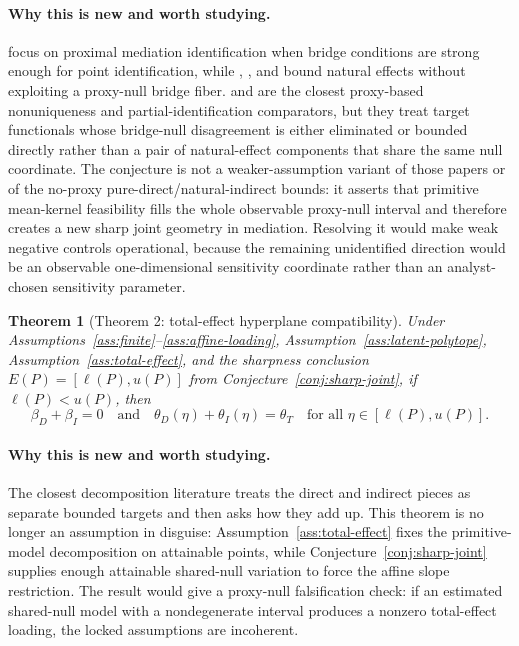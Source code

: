 \documentclass[11pt]{article}
\theoremstyle{definition}
\theoremstyle{plain}
\newtheorem{theorem}{Theorem}
\theoremstyle{remark}
\begin{document}
\paragraph{Why this is new and worth studying.}
\citet{DukesShpitserTchetgen2023} focus on proximal mediation identification
when bridge conditions are strong enough for point identification, while
\citet{MilesKankiMeloniTchetgen2015},
\citet{MilesKankiMeloniTchetgen2017}, and
\citet{DingVanderWeele2016} bound natural effects without exploiting a
proxy-null bridge fiber.
\citet{ZhangLiMiaoTchetgen2023} and
\citet{GhassamiShpitserTchetgen2023} are the closest proxy-based
nonuniqueness and partial-identification comparators, but they treat target
functionals whose bridge-null disagreement is either eliminated or bounded
directly rather than a pair of natural-effect components that share the same
null coordinate.  The conjecture is not a weaker-assumption variant of those
papers or of the no-proxy pure-direct/natural-indirect bounds: it asserts that
primitive mean-kernel feasibility fills the whole observable proxy-null
interval and therefore creates a new sharp joint geometry in mediation.
Resolving it would make weak negative
controls operational, because the remaining unidentified direction would be an
observable one-dimensional sensitivity coordinate rather than an analyst-chosen
sensitivity parameter.

\begin{theorem}[Theorem 2: total-effect hyperplane compatibility]\label{thm:te-plane}
Under Assumptions~\ref{ass:finite}--\ref{ass:affine-loading},
Assumption~\ref{ass:latent-polytope}, Assumption~\ref{ass:total-effect}, and
the sharpness conclusion \(E(P)=[\ell(P),u(P)]\) from
Conjecture~\ref{conj:sharp-joint}, if \(\ell(P)<u(P)\), then
\[
  \beta_D+\beta_I=0
  \quad\text{and}\quad
  \theta_D(\eta)+\theta_I(\eta)=\theta_T
  \quad\text{for all }\eta\in[\ell(P),u(P)].
\]
\end{theorem}

\paragraph{Why this is new and worth studying.}
The closest decomposition literature treats the direct and indirect pieces as
separate bounded targets and then asks how they add up.  This theorem is no
longer an assumption in disguise: Assumption~\ref{ass:total-effect} fixes the
primitive-model decomposition on attainable points, while
Conjecture~\ref{conj:sharp-joint} supplies enough attainable shared-null
variation to force the affine slope restriction.  The result would give a
proxy-null falsification check: if an estimated shared-null model with a
nondegenerate interval produces a nonzero total-effect loading, the locked
assumptions are incoherent.
\end{document}
